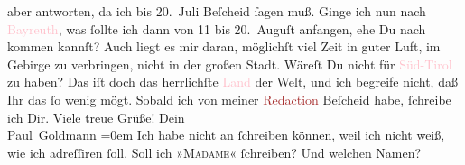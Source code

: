                aber  antworten, da ich bis 20. Juli Beſcheid ſagen muß. Ginge ich nun nach \textcolor{pink}{Bayreuth}{}\ledrightnote{\textcolor{pink}{Bayreuth}}, was ſollte ich dann von 11 bis 20. Auguſt
               anfangen, ehe Du nach \label{K_L02817-4v}\label{K_L02817-4h} kommen kannſt? Auch liegt es mir daran, möglichſt viel
               Zeit in guter Luft, im Gebirge zu verbringen, nicht in der großen Stadt. {\pb}Wäreſt Du nicht für \textcolor{pink}{Süd-Tirol}{}\ledrightnote{\textcolor{pink}{Südtirol}} zu haben? Das iſt doch das herrlichſte \textcolor{pink}{Land}{} der Welt, und ich begreife nicht, daß
               Ihr das ſo wenig mögt.\pend
           \pstart
           Sobald ich von meiner \textcolor{brown}{Redaction}{}
               Beſcheid habe, ſchreibe ich Dir.\pend
           \pstart
           Viele treue Grüße!\pend
           \pstart
           Dein {\\[\baselineskip]}\spacefill\mbox{Paul Goldmann}\pend
           \leftskip=0em{}\pstart
           \noindent{}Ich habe nicht an \label{K_L02817-8v}\label{K_L02817-8h} ſchreiben können, weil ich nicht weiß, wie ich adreſſiren ſoll. Soll ich
                     »\textsc{Madame}« ſchreiben? Und welchen Namen?\pend
           \endnumbering{}\begin{anhang}\end{anhang}
      